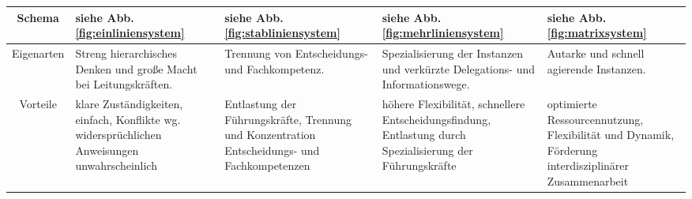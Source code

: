 \begin{table}[H]
\begin{tabularx}{\textwidth}{|c|X|X|X|X|}
        \hline
        Schema     & siehe Abb. \ref{fig:einliniensystem}                                                                                                                     & siehe Abb. \ref{fig:stabliniensystem}                                                                                             & siehe Abb. \ref{fig:mehrliniensystem}                                                                                                                                                                                                                     & siehe Abb. \ref{fig:matrixsystem}                                                                                                                                                                                                                                   \\
        \hline
        Eigenarten & Streng hierarchisches Denken und große Macht bei Leitungskräften.                                                                                        & Trennung von Entscheidungs- und Fachkompetenz.                                                                                    & Spezialisierung der Instanzen und verkürzte Delegations- und Informationswege.                                                                                                                                                                            & Autarke und schnell agierende Instanzen.                                                                                                                                                                                                                            \\
        \hline
        Vorteile   & klare Zuständigkeiten, einfach, Konflikte wg. widersprüchlichen Anweisungen unwahrscheinlich                                                             & Entlastung der Führungskräfte, Trennung und Konzentration Entscheidungs- und Fachkompetenzen                                      & höhere Flexibilität, schnellere Entscheidungsfindung, Entlastung durch Spezialisierung der Führungskräfte                                                                                                                                                 & optimierte Ressourcennutzung, Flexibilität und Dynamik, Förderung interdisziplinärer Zusammenarbeit                                                                                                                                                                 \\

\end{tabularx}
\end{table}
